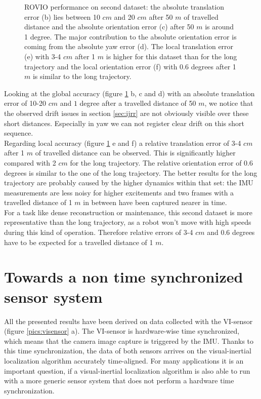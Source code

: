 \begin{figure}[h]
\begin{subfigure}[b]{0.45\textwidth}
    \caption{}
  \end{subfigure}
   \caption{ROVIO performance on second dataset: the absolute translation error (b) lies between 10 $cm$ and 20 $cm$ after 50 $m$ of travelled distance and the absolute orientation error (c) after 50 $m$ is around 1 degree. The major contribution to the absolute orientation error is coming from the absolute yaw error (d). The local translation error (e) with 3-4 $cm$ after 1 $m$ is higher for this dataset than for the long trajectory and the local orientation error (f) with 0.6 degrees after 1 $m$ is similar to the long trajectory.}
   \label{pics:euroc}
\end{figure}

Looking at the global accuracy (figure \ref{pics:euroc} b, c and d) with an absolute translation error of 10-20 $cm$ and $1$ degree after a travelled distance of 50 $m$, we notice that the observed drift issues in section \ref{sec:ijrr} are not obviously visible over these short distances. Especially in yaw we can not register clear drift on this short sequence. \\

Regarding local accuracy (figure \ref{pics:euroc} e and f) a relative translation error of 3-4 $cm$ after 1 $m$ of travelled distance can be observed. This is significantly higher compared with 2 $cm$ for the long trajectory. The relative orientation error of 0.6 degrees is similar to the one of the long trajectory. The better results for the long trajectory are probably caused by the higher dynamics within that set: the IMU measurements are less noisy for higher excitements and two frames with a travelled distance of 1 $m$ in between have been captured nearer in time. \\

For a task like dense reconstruction or maintenance, this second dataset is more representative than the long trajectory, as a robot won't move with high speeds during this kind of operation. Therefore relative errors of 3-4 $cm$ and 0.6 degrees have to be expected for a travelled distance of 1 $m$.

\section{Towards a non time synchronized sensor system}
\label{sec:timesync}

All the presented results have been derived on data collected with the VI-sensor (figure \ref{pics:visensor} a). The VI-sensor is hardware-wise time synchronized, which means that the camera image capture is triggered by the IMU. Thanks to this time synchronization, the data of both sensors arrives on the visual-inertial localization algorithm accurately time-aligned. For many applications it is an important question, if a visual-inertial localization algorithm is also able to run with a more generic sensor system that does not perform a hardware time synchronization. \\

